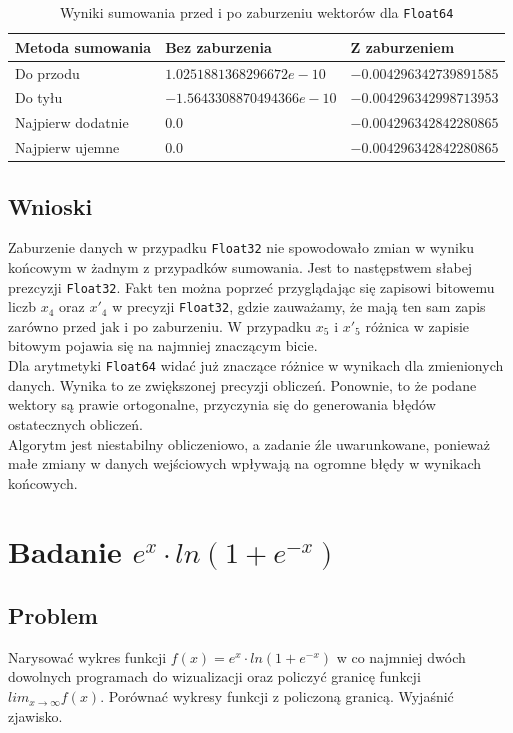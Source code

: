 \documentclass{article}
\begin{document}
        {\small
        \begin{table}[h!]
        \begin{tabular}{l l l}
            \hline
             Metoda sumowania & Bez zaburzenia & Z zaburzeniem \\
             \hline
            Do przodu & $1.0251881368296672e-10$ & $-0.004296342739891585$ \\
            Do tyłu & $-1.5643308870494366e-10$ & $-0.004296342998713953$ \\
            Najpierw dodatnie & $0.0$ & $-0.004296342842280865$ \\
            Najpierw ujemne & $0.0$ & $-0.004296342842280865$ \\
            \hline
        \end{tabular}
        \caption{Wyniki sumowania przed i po zaburzeniu wektorów dla \texttt{Float64}}
        \label{table:zad1:float64}
        \end{table}
        }
    \subsection{Wnioski}
        Zaburzenie danych w przypadku \texttt{Float32} nie spowodowało zmian w wyniku końcowym w żadnym z przypadków sumowania. Jest to następstwem słabej prezcyzji \texttt{Float32}. Fakt ten można poprzeć przyglądając się zapisowi bitowemu liczb $x_4$ oraz $x'_4$ w precyzji \texttt{Float32}, gdzie zauważamy, że mają ten sam zapis zarówno przed jak i po zaburzeniu. W przypadku $x_5$ i $x'_5$ różnica w zapisie bitowym pojawia się na najmniej znaczącym bicie.\\
        Dla arytmetyki \texttt{Float64} widać już znaczące różnice w wynikach dla zmienionych danych. Wynika to ze zwiększonej precyzji obliczeń. Ponownie, to że podane wektory są prawie ortogonalne, przyczynia się do generowania błędów ostatecznych obliczeń. \\
        Algorytm jest niestabilny obliczeniowo, a zadanie źle uwarunkowane, ponieważ małe zmiany w danych wejściowych wpływają na ogromne błędy w wynikach końcowych.
    \section{Badanie $e^x\cdot ln(1 + e^{-x})$}
        \subsection{Problem}
            Narysować wykres funkcji $f(x) = e^x\cdot ln(1 + e^{-x})$ w co najmniej dwóch dowolnych programach do wizualizacji oraz policzyć granicę funkcji $lim_{x\rightarrow\infty}f(x)$. Porównać wykresy funkcji z policzoną granicą. Wyjaśnić zjawisko.
\end{document}
